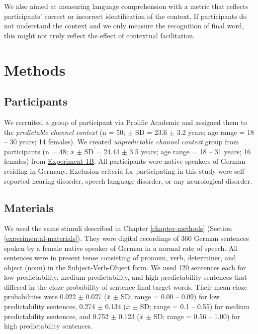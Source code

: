 \documentclass[a4paper, nobind]{templates/ociamthesis}
\begin{document}
We also aimed at measuring language comprehension with a metric that reflects participants' correct or incorrect identification of the context.
If participants do not understand the context and we only measure the recognition of final word, this might not truly reflect the effect of contextual facilitation.

\hypertarget{methods-2}{%
\section{Methods}\label{methods-2}}

\hypertarget{participants-1}{%
\subsection{Participants}\label{participants-1}}

We recruited a group of participant via Prolific Academic and assigned them to the \emph{predictable channel context} (n = 50; \(\pm\) SD = 23.6 \(\pm\) 3.2 years; age range = 18 -- 30 years; 14 females).
We created \emph{unpredictable channel context} group from participants (n = 48; \(\bar{x}\) \(\pm\) SD = 24.44 \(\pm\) 3.5 years; age range = 18 -- 31 years; 16 females) from \protect\hyperlink{experiment1b}{Experiment 1B}.
All participants were native speakers of German residing in Germany.
Exclusion criteria for participating in this study were self-reported hearing disorder, speech-language disorder, or any neurological disorder.

\hypertarget{materials-1}{%
\subsection{Materials}\label{materials-1}}

We used the same stimuli described in Chapter \ref{chapter-methods} (Section \ref{experimental-materials}).
They were digital recordings of 360 German sentences spoken by a female native speaker of German in a normal rate of speech.
All sentences were in present tense consisting of pronoun, verb, determiner, and object (noun) in the Subject-Verb-Object form.
We used 120 sentences each for low predictability, medium predictability, and high predictability sentences that differed in the cloze probability of sentence final target words.
Their mean cloze probabilities were 0.022 \(\pm\) 0.027 (\(\bar{x}\) \(\pm\) SD; range = 0.00 -- 0.09) for low predictability sentences, 0.274 \(\pm\) 0.134 (\(\bar{x}\) \(\pm\) SD; range = 0.1 -- 0.55) for medium predictability sentences, and 0.752 \(\pm\) 0.123 (\(\bar{x}\) \(\pm\) SD; range = 0.56 -- 1.00) for high predictability sentences.
\end{document}
